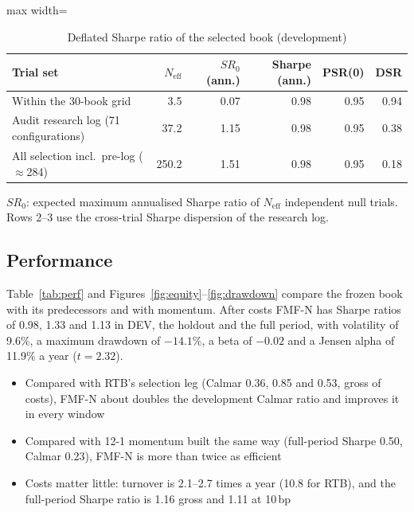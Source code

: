 \begin{table}[t]
\centering\small
\caption{Deflated Sharpe ratio of the selected book (development)}\label{tab:dsr}
\begin{adjustbox}{max width=\textwidth}\begin{tabular}{lrrrrr}
\toprule
Trial set & $N_{\text{eff}}$ & $SR_0$ (ann.) & Sharpe (ann.) & PSR(0) & DSR\\
\midrule
Within the 30-book grid & 3.5 & 0.07 & 0.98 & 0.95 & 0.94\\
Audit research log (71 configurations) & 37.2 & 1.15 & 0.98 & 0.95 & 0.38\\
All selection incl.\ pre-log ($\approx$284) & 250.2 & 1.51 & 0.98 & 0.95 & 0.18\\
\bottomrule
\end{tabular}\end{adjustbox}
\par\smallskip\begin{minipage}{0.9\textwidth}\footnotesize $SR_0$: expected maximum annualised Sharpe ratio of $N_{\text{eff}}$ independent null trials. Rows 2--3 use the cross-trial Sharpe dispersion of the research log.\end{minipage}
\end{table}

\subsection{Performance}

Table~\ref{tab:perf} and Figures~\ref{fig:equity}--\ref{fig:drawdown} compare the frozen book with its predecessors and with momentum. After costs FMF-N has Sharpe ratios of 0.98, 1.33 and 1.13 in DEV, the holdout and the full period, with volatility of 9.6\%, a maximum drawdown of $-14.1\%$, a beta of $-0.02$ and a Jensen alpha of 11.9\% a year ($t = 2.32$).
\begin{itemize}
  \item Compared with RTB's selection leg (Calmar 0.36, 0.85 and 0.53, gross of costs), FMF-N about doubles the development Calmar ratio and improves it in every window
  \item Compared with 12-1 momentum built the same way (full-period Sharpe 0.50, Calmar 0.23), FMF-N is more than twice as efficient
  \item Costs matter little: turnover is 2.1--2.7 times a year (10.8 for RTB), and the full-period Sharpe ratio is 1.16 gross and 1.11 at 10\,bp
\end{itemize}

